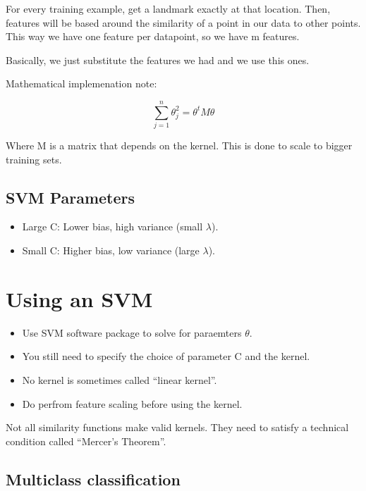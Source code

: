 For every training example, get a landmark exactly at that location.
Then, features will be based around the similarity of a point in our
data to other points. This way we have one feature per datapoint, so we
have m features. \smallskip

Basically, we just substitute the features we had and we use this ones.

Mathematical implemenation note:

\begin{equation} 
\sum_{j=1}^n \theta_j^2 = \theta^t M \theta
\end{equation}

Where M is a matrix that depends on the kernel. This is done to scale to
bigger training sets.

\subsection{SVM Parameters}\label{svm-parameters}

\begin{itemize}
\itemsep1pt\parskip0pt
\item
  Large C: Lower bias, high variance (small $\lambda$).
\item
  Small C: Higher bias, low variance (large $\lambda$).
\end{itemize}

\section{Using an SVM}\label{using-an-svm}

\begin{itemize}
\itemsep1pt\parskip0pt
\item
  Use SVM software package to solve for paraemters $\theta$.
\item
  You still need to specify the choice of parameter C and the kernel.
\item
  No kernel is sometimes called ``linear kernel''.
\item
  Do perfrom feature scaling before using the kernel.
\end{itemize}

Not all similarity functions make valid kernels. They need to satisfy a
technical condition called ``Mercer's Theorem''.

\subsection{Multiclass classification}\label{multiclass-classification}

